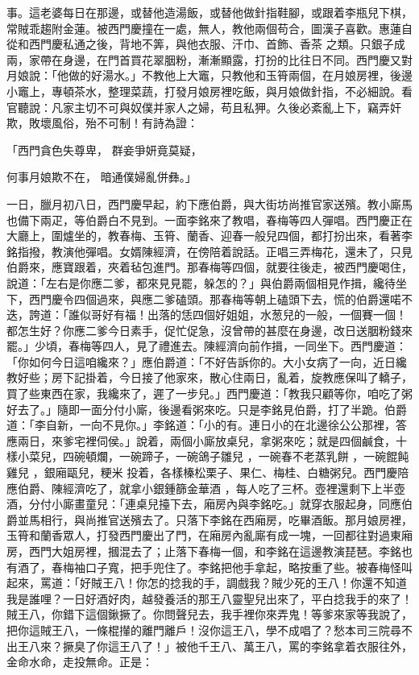 \begin{showcontents}{}
事。這老婆每日在那邊，或替他造湯飯，或替他做針指鞋腳，或跟着李瓶兒下棋，常賊乖趨附金蓮。被西門慶撞在一處，無人，教他兩個苟合，圖漢子喜歡。惠蓮自從和西門慶私通之後，背地不筭，與他衣服、汗巾、首飾、香茶 之類。只銀子成兩，家帶在身邊，在門首買花翠胭粉，漸漸顯露，打扮的比往日不同。西門慶又對月娘說：「他做的好湯水。」不教他上大竈，只教他和玉筲兩個，在月娘房裡，後邊小竈上，專頓茶水，整理菜蔬，打發月娘房裡吃飯，與月娘做針指，不必細說。看官聽說：凡家主切不可與奴僕并家人之婦，苟且私狎。久後必紊亂上下，竊弄奸欺，敗壞風俗，殆不可制！有詩為證：

「西門貪色失尊卑，  群妾爭妍竟莫疑，

何事月娘欺不在，  暗通僕婦亂併彝。」

一日，臘月初八日，西門慶早起，約下應伯爵，與大街坊尚推官家送殯。教小廝馬也備下兩疋，等伯爵白不見到。一面李銘來了教唱，春梅等四人彈唱。西門慶正在大廳上，圍爐坐的，教春梅、玉筲、蘭香、迎春一般兒四個，都打扮出來，看著李銘指撥，教演他彈唱。女婿陳經濟，在傍陪着說話。正唱三弄梅花，還未了，只見伯爵來，應寶跟着，夾着毡包進門。那春梅等四個，就要往後走，被西門慶喝住，說道：「左右是你應二爹，都來見見罷，躲怎的？」與伯爵兩個相見作揖，纔待坐下，西門慶令四個過來，與應二爹磕頭。那春梅等朝上磕頭下去，慌的伯爵還喏不迭，誇道：「誰似哥好有福！出落的恁四個好姐姐，水葱兒的一般，一個賽一個！都怎生好？你應二爹今日素手，促忙促急，沒曾帶的甚麼在身邊，改日送胭粉錢來罷。」少頃，春梅等四人，見了禮進去。陳經濟向前作揖，一同坐下。西門慶道：「你如何今日這咱纔來？」應伯爵道：「不好告訴你的。大小女病了一向，近日纔教好些；房下記掛着，今日接了他家來，散心住兩日，亂着，旋教應保叫了轎子，買了些東西在家，我纔來了，遲了一步兒。」西門慶道：「教我只顧等你，咱吃了粥好去了。」隨即一面分付小廝，後邊看粥來吃。只是李銘見伯爵，打了半跪。伯爵道：「李自新，一向不見你。」李銘道：「小的有。連日小的在北邊徐公公那裡，答應兩日，來爹宅裡伺侯。」說着，兩個小廝放桌兒，拿粥來吃；就是四個鹹食，十樣小菜兒，四碗頓爛，一碗蹄子，一碗鴿子雛兒 ，一碗春不老蒸乳餅 ，一碗餛飩雞兒 ，銀廂甌兒，粳米 投着，各樣榛松栗子、果仁、梅桂、白糖粥兒。西門慶陪應伯爵、陳經濟吃了，就拿小銀鍾篩金華酒 ，每人吃了三杯。壺裡還剩下上半壺酒，分付小廝畫童兒：「連桌兒擡下去，廂房內與李銘吃。」就穿衣服起身，同應伯爵並馬相行，與尚推官送殯去了。只落下李銘在西廂房，吃畢酒飯。那月娘房裡，玉筲和蘭香眾人，打發西門慶出了門，在廂房內亂廝有成一塊，一回都往對過東廂房，西門大姐房裡，摑混去了；止落下春梅一個，和李銘在這邊教演琵琶。李銘也有酒了，春梅袖口子寬，把手兜住了。李銘把他手拿起，略按重了些。被春梅怪叫起來，罵道：「好賊王八！你怎的捻我的手，調戲我？賊少死的王八！你還不知道我是誰哩？一日好酒好肉，越發養活的那王八靈聖兒出來了，平白捻我手的來了！賊王八，你錯下這個鍬撅了。你問聲兒去，我手裡你來弄鬼！等爹來家等我說了，把你這賊王八，一條棍攆的離門離戶！沒你這王八，學不成唱了？愁本司三院尋不出王八來？撅臭了你這王八了！」被他千王八、萬王八，罵的李銘拿着衣服往外，金命水命，走投無命。正是：


\end{showcontents}
